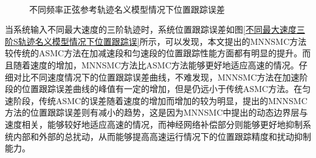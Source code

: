 \begin{figure}[H]\centering
	\\
	\caption{不同频率正弦参考轨迹名义模型情况下位置跟踪误差}\label{不同频率正弦参考轨迹名义模型情况下位置跟踪误差}
\end{figure}
当系统输入不同最大速度的三阶轨迹时，系统位置跟踪误差如图\ref{不同最大速度三阶S轨迹名义模型情况下位置跟踪误}所示，可以发现，本文提出的MNNSMC方法较传统的ASMC方法在加减速段和匀速段的位置跟踪性能方面都有明显的提升。而且随着速度的增加，MNNSMC方法比ASMC方法能够更好地适应高速的情况。仔细对比不同速度情况下的位置跟踪误差曲线，不难发现，MNNSMC方法在加速阶段的位置跟踪误差曲线的峰值有一定的增加，但是仍远小于传统ASMC方法。在匀速阶段，传统ASMC的误差随着速度的增加而增加的较为明显，提出的MNNSMC方法的位置跟踪误差则有减小的趋势，这是因为MNNSMC中提出的动态边界层与速度相关，能够较好地适应高速的情况，而神经网络补偿部分则能够更好地抑制系统内部和外部的总扰动，从而能够提高高速运行情况下的位置跟踪精度和扰动抑制能力。
